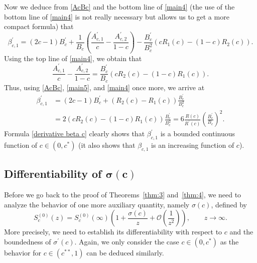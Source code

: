 \documentclass[pdftex]{sigma}
\numberwithin{equation}{section}
\begin{document}
Now we deduce from \eqref{AcBc} and the bottom line of \eqref{main4} (the use of the bottom line of \eqref{main4} is not really necessary but allows us to get a more compact formula) that
\[
\beta_{c,1}^\prime = (2c-1)B_c^\prime + \frac 1{B_c}\left( \frac{A_{c,1}^\prime}c - \frac{A_{c,2}^\prime}{1-c} \right) - \frac{B_c^\prime}{B_c^2}(cR_1(c)-(1-c)R_2(c)).
\]
Using the top line of \eqref{main4}, we obtain that
\[
\frac{A_{c,1}^\prime}c - \frac{A_{c,2}^\prime}{1-c} = \frac{B_c^\prime}{B_c} ( c R_2(c) - (1-c)R_1(c) ).
\]
Thus, using \eqref{AcBc}, \eqref{main5}, and \eqref{main4} once more, we arrive at
\begin{align}
\beta_{c,1}^\prime & = (2c-1)B_c^\prime + ( R_2(c) - R_1(c))\frac{B_c^\prime}{B_c^2} \nonumber \\
& = 2 ( cR_2(c) - (1-c)R_1(c))\frac{B_c^\prime}{B_c^2} = 6\frac{R(c)}{R^\prime(c)} \left( \frac{B_c^\prime}{B_c} \right)^2.
\label{derivative beta c}
\end{align}
Formula \eqref{derivative beta c} clearly shows that $ \beta_{c,1}^\prime $ is a bounded continuous function of $ c\in(0,c^*) $ (it also shows that $ \beta_{c,1} $ is an increasing function of $ c $).

\subsection[Differentiability of sigma(c)]{Differentiability of $\boldsymbol{\sigma(c)} $}

Before we go back to the proof of Theorems~\ref{thm:3} and~\ref{thm:4}, we need to analyze the behavior of one more auxiliary quantity, namely $ \sigma(c) $, defined by
\begin{equation}
\label{def sigma c}
S_c^{(0)}(z) = S_c^{(0)}(\infty) \left( 1 + \frac{\sigma(c)}z + \mathcal O\left(\frac1{z^2}\right) \right), \qquad z\to\infty.
\end{equation}
More precisely, we need to establish its differentiability with respect to $ c $ and the boundedness of $ \sigma^\prime(c) $. Again, we only consider the case $ c\in(0,c^*) $ as the behavior for $ c\in(c^{**},1) $ can be deduced similarly.
\end{document}
